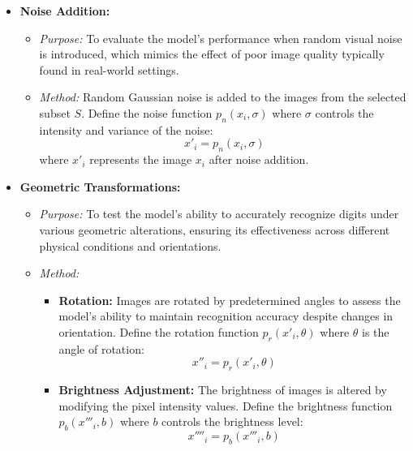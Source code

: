 \documentclass[10pt, conference, a4paper, final]{IEEEtran}
\begin{document}
\begin{itemize}
    \item \textbf{Noise Addition:}
        \begin{itemize}
            \item \textit{Purpose:} To evaluate the model's performance when random visual noise is introduced, which mimics the effect of poor image quality typically found in real-world settings.
            \item \textit{Method:} Random Gaussian noise is added to the images from the selected subset \( S \). Define the noise function \( p_n(x_i, \sigma) \) where \( \sigma \) controls the intensity and variance of the noise:
            \[ x'_i = p_n(x_i, \sigma) \]
            where \( x'_i \) represents the image \( x_i \) after noise addition.
        \end{itemize}

    \item \textbf{Geometric Transformations:}
        \begin{itemize}
            \item \textit{Purpose:} To test the model's ability to accurately recognize digits under various geometric alterations, ensuring its effectiveness across different physical conditions and orientations.
            \item \textit{Method:}
                \begin{itemize}
                    \item \textbf{Rotation:} Images are rotated by predetermined angles to assess the model's ability to maintain recognition accuracy despite changes in orientation. Define the rotation function \( p_r(x'_i, \theta) \) where \( \theta \) is the angle of rotation:
                    \[ x''_i = p_r(x'_i, \theta) \]
                    \item \textbf{Brightness Adjustment:} The brightness of images is altered by modifying the pixel intensity values. Define the brightness function \( p_b(x'''_i, b) \) where \( b \) controls the brightness level:
                    \[ x''''_i = p_b(x'''_i, b) \]
                \end{itemize}
        \end{itemize}
\end{itemize}
\end{document}
